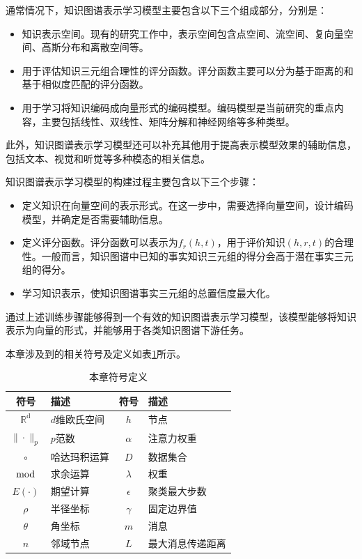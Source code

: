 \documentclass[algorithmlist, AutoFakeBold, AutoFakeSlant, figurelist, tablelist, nomlist, engineering]{seuthesix}
\begin{document}
通常情况下，知识图谱表示学习模型主要包含以下三个组成部分，分别是：
\begin{itemize}
  \item [1)] 知识表示空间。现有的研究工作中，表示空间包含点空间、流空间、复向量空间、高斯分布和离散空间等。
  \item [2)] 用于评估知识三元组合理性的评分函数。评分函数主要可以分为基于距离的和基于相似度匹配的评分函数。
  \item [3)] 用于学习将知识编码成向量形式的编码模型。编码模型是当前研究的重点内容，主要包括线性、双线性、矩阵分解和神经网络等多种类型。
\end{itemize}
此外，知识图谱表示学习模型还可以补充其他用于提高表示模型效果的辅助信息，包括文本、视觉和听觉等多种模态的相关信息。

知识图谱表示学习模型的构建过程主要包含以下三个步骤：
\begin{itemize}
  \item [1)] 定义知识在向量空间的表示形式。在这一步中，需要选择向量空间，设计编码模型，并确定是否需要辅助信息。
  \item [2)] 定义评分函数。评分函数可以表示为$f_r(h, t)$，用于评价知识$(h, r, t)$的合理性。一般而言，知识图谱中已知的事实知识三元组的得分会高于潜在事实三元组的得分。
  \item [3)] 学习知识表示，使知识图谱事实三元组的总置信度最大化。
\end{itemize}
通过上述训练步骤能够得到一个有效的知识图谱表示学习模型，该模型能够将知识表示为向量的形式，并能够用于各类知识图谱下游任务。

本章涉及到的相关符号及定义如表\ref{2_symbols}所示。
\begin{table}[ht]
  \centering
  \begin{tabular*}{0.8\textwidth}{@{\extracolsep{\fill}}clcl}
		\toprule[1pt]
    符号 & 描述 & 符号 & 描述 \\ \hline
    $\mathbb{R}^{\mathrm{d}}$ & $d$维欧氏空间 & $h$ & 节点\\
    $\|\cdot\|_{p}$ & $p$范数 & $\alpha$ & 注意力权重\\
    $\circ$ & 哈达玛积运算 & $D$ & 数据集合\\
    $\bmod$ & 求余运算 & $\lambda$ & 权重\\ 
    $E(\cdot)$ & 期望计算 & $\epsilon$ & 聚类最大步数\\
    $\rho$ & 半径坐标 & $\gamma$ & 固定边界值\\
    $\theta$ & 角坐标 & $m$ & 消息\\
    $n$ & 邻域节点 & $L$ & 最大消息传递距离\\
		\bottomrule[1pt]
	\end{tabular*}
  \caption{本章符号定义}
  \label{2_symbols}
\end{table}
\end{document}
